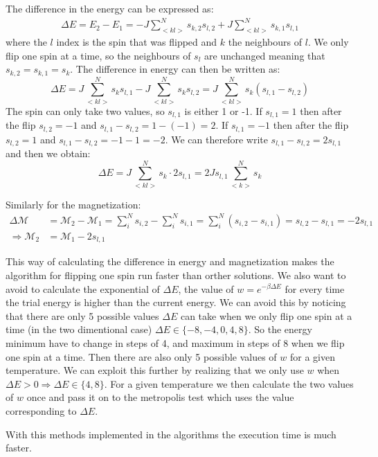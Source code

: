 \documentclass[11pt,a4wide]{article}
\begin{document}
The difference in the energy can be expressed as:
\begin{align*}
\Delta E = E_2 - E_1 = -J\sum_{<kl>}^N s_{k,2}s_{l,2} + J\sum_{<kl>}^N s_{k,1}s_{l,1}
\end{align*}
where the $l$ index is the spin that was flipped and $k$ the neighbours of $l$.  We only flip one spin at a time, so the neighbours of $s_l$ are unchanged meaning that $s_{k,2} = s_{k,1} = s_k$. The difference in energy can then be written as:
\[
\Delta E = J\sum_{<kl>}^N s_ks_{l,1} - J\sum_{<kl>}^N s_ks_{l,2} = J\sum_{<kl>}^N s_k(s_{l,1} - s_{l,2} )
\]
The spin can only take two values, so $s_{l,1}$ is either 1 or -1. If $s_{l,1}=1$ then after the flip $s_{l,2} = -1$ and $s_{l,1} - s_{l,2} = 1 - (-1) = 2$. If $s_{l,1}=-1$ then after the flip $s_{l,2} = 1$ and $s_{l,1} - s_{l,2} = -1 - 1 = -2$. We can therefore write $s_{l,1} - s_{l,2} = 2s_{l,1}$ and then we obtain:
\[
\Delta E = J\sum_{<kl>}^N s_k\cdot 2s_{l,1} = 2Js_{l,1}\sum_{<k>}^N s_k
\]

Similarly for the magnetization:
\begin{align*}
\Delta \mathcal{M} &= \mathcal{M}_2 - \mathcal{M}_1 = \sum_i^N s_{i,2} - \sum_i^N s_{i,1} = \sum_i^N (s_{i,2} -  s_{i,1}) = s_{l,2} - s_{l,1} = -2s_{l,1}\\
\Rightarrow \mathcal{M}_2 &= \mathcal{M}_1 - 2s_{l,1}
\end{align*}

This way of calculating the difference in energy and magnetization makes the algorithm for flipping one spin run faster than orther solutions. We also want to avoid to calculate the exponential of $\Delta E $, the value of $w=e^{-\beta\Delta E}$ for every time the trial energy is higher than the current energy. We can avoid this by noticing that there are only 5 possible values $\Delta E$ can take when we only flip one spin at a time (in the two dimentional case) $\Delta E \in \{-8, -4, 0, 4, 8\}$. So the energy minimum have to change in steps of 4, and maximum in steps of 8 when we flip one spin at a time. Then there are also only 5 possible values of $w$ for a given temperature. We can exploit this further by realizing that we only use $w$ when $\Delta E > 0 \Rightarrow \Delta E \in \{4, 8\}$. For a given temperature we then calculate the two values of $w$ once and pass it on to the metropolis test which uses the value corresponding to $\Delta E$. 

With this methods implemented in the algorithms the execution time is much faster. 
\end{document}

